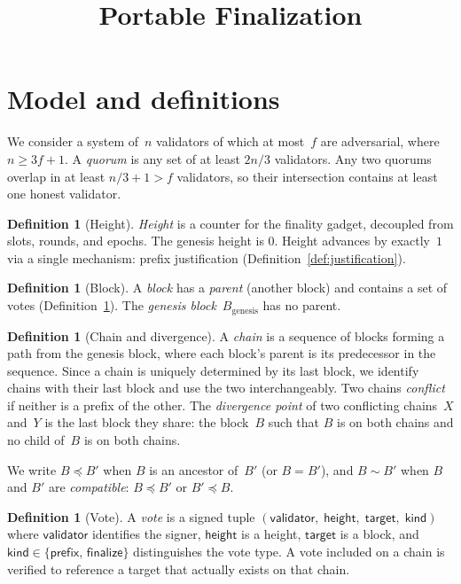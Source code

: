 \ifx\litemode\undefined\documentclass{article}\fi
\title{Portable Finalization}
\newcommand{\target}{\mathsf{target}}
\newcommand{\kind}{\mathsf{kind}}
\newcommand{\height}{\mathsf{height}}
\newcommand{\finalize}{\mathsf{finalize}}
\newcommand{\validator}{\mathsf{validator}}
\newcommand{\prefix}{\mathsf{prefix}}
\theoremstyle{plain}
\theoremstyle{definition}
\newtheorem{definition}[theorem]{Definition}
\theoremstyle{remark}
\begin{document}
\maketitle

\section{Model and definitions}

We consider a system of~$n$ validators of which at most~$f$ are adversarial, where $n \geq 3f + 1$.
A \emph{quorum} is any set of at least $2n/3$ validators.
Any two quorums overlap in at least $n/3 + 1 > f$ validators, so their intersection contains at least one honest validator.

\begin{definition}[Height]\label{def:height}
\emph{Height} is a counter for the finality gadget, decoupled from slots, rounds, and epochs.
The genesis height is $0$.
Height advances by exactly~$1$ via a single mechanism: prefix justification (Definition~\ref{def:justification}).
\end{definition}

\begin{definition}[Block]\label{def:block}
A \emph{block} has a \emph{parent} (another block) and contains a set of votes (Definition~\ref{def:vote}).
The \emph{genesis block}~$B_{\mathrm{genesis}}$ has no parent.
\end{definition}

\begin{definition}[Chain and divergence]\label{def:chain}
A \emph{chain} is a sequence of blocks forming a path from the genesis block, where each block's parent is its predecessor in the sequence.
Since a chain is uniquely determined by its last block, we identify chains with their last block and use the two interchangeably.
Two chains \emph{conflict} if neither is a prefix of the other.
The \emph{divergence point} of two conflicting chains~$X$ and~$Y$ is the last block they share: the block~$B$ such that $B$ is on both chains and no child of~$B$ is on both chains.
\end{definition}

We write $B \preceq B'$ when $B$ is an ancestor of~$B'$ (or $B = B'$), and $B \sim B'$ when $B$ and $B'$ are \emph{compatible}: $B \preceq B'$ or $B' \preceq B$.

\begin{definition}[Vote]\label{def:vote}
A \emph{vote} is a signed tuple $(\validator,\; \height,\; \target,\; \kind)$ where $\validator$ identifies the signer, $\height$ is a height, $\target$ is a block, and $\kind \in \{\prefix,\, \finalize\}$ distinguishes the vote type.
A vote included on a chain is verified to reference a target that actually exists on that chain.
\end{definition}
\end{document}
